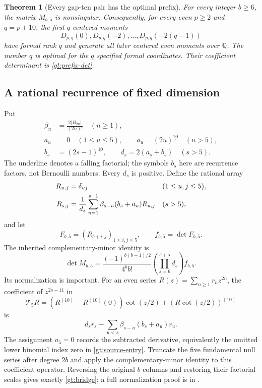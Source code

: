 \documentclass[11pt,a4paper]{article}
\newtheorem{theorem}{Theorem}[section]
\theoremstyle{definition}
\theoremstyle{remark}
\numberwithin{equation}{section}
\begin{document}
\begin{theorem}[Every gap-ten pair has the optimal prefix]
\label{gt:main}
For every integer $b\ge6$, the matrix $M_{b,5}$ is nonsingular.
Consequently, for every even $p\ge2$ and $q=p+10$, the first $q$
centered moments
\[
 D_{p,q}(0),D_{p,q}(-2),\ldots,D_{p,q}(-2(q-1))
\]
have formal rank $q$ and generate all later centered even moments
over $\mathbb Q$. The number $q$ is optimal for the $q$ specified
formal coordinates. Their coefficient determinant is
\eqref{gt:prefix-det}.
\end{theorem}

\subsection{A rational recurrence of fixed dimension}

Put
\begin{align*}
 \beta_n&=\frac{2|B_{2n}|}{(2n)!}\quad(n\ge1),\\
 a_u&=0\quad(1\le u\le5),\qquad
 a_u=(2u)^{\underline{10}}\quad(u>5),\\
 b_s&=(2s-1)^{\underline{10}},\qquad
 d_s=2(a_s+b_s)\quad(s>5).
\end{align*}
The underline denotes a falling factorial; the symbols $b_s$ here
are recurrence factors, not Bernoulli numbers. Every $d_s$ is positive.
Define the rational array
\begin{align}
 R_{u,j}&=\delta_{uj}&&(1\le u,j\le5),\notag\\
 R_{s,j}&=\frac1{d_s}\sum_{u=1}^{s-1}
             \beta_{s-u}(b_s+a_u)R_{u,j}&&(s>5),
 \label{gt:recurrence}
\end{align}
and let
\[
 F_{b,5}=(R_{b+i,j})_{1\le i,j\le5},\qquad f_{b,5}=\det F_{b,5}.
\]
The inherited complementary-minor identity is
\begin{equation}\label{gt:bridge}
 \det M_{b,5}=
 \frac{(-1)^{b(b-1)/2}}{4^bb!}
            \left(\prod_{s=6}^{b+5}d_s\right)f_{b,5}.
\end{equation}
Its normalization is important. For an even series
$R(z)=\sum_{n\ge1}r_nz^{2n}$, the coefficient of $z^{2s-11}$ in
\begin{equation}\label{gt:null}
 \mathcal T_5R=(R^{(10)}-R^{(10)}(0))\cot(z/2)
                               +(R\cot(z/2))^{(10)}
\end{equation}
is
\[
 d_sr_s-\sum_{u<s}\beta_{s-u}(b_s+a_u)r_u.
\]
The assignment $a_5=0$ records the subtracted derivative, equivalently
the omitted lower binomial index zero in \eqref{gt:source-entry}.
Truncate the five fundamental null series after degree $2b$ and
apply the complementary-minor identity to this coefficient operator.
Reversing the original $b$ columns and restoring their factorial
scales gives exactly \eqref{gt:bridge}; a full normalization proof
is in \cite[Gamma-basis section]{OrderedBoundary}.
\end{document}
